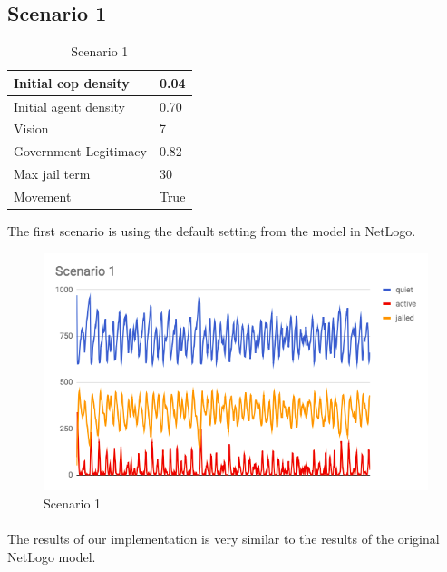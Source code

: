 \documentclass[11pt]{article}
\begin{document}
    \subsection{Scenario 1}
     \begin{table}[ht]
        \begin{center}
          \begin{tabular}{|l|l|}
          \hline
            Initial cop density & 0.04 \\
          \hline
            Initial agent density & 0.70 \\
          \hline
            Vision & 7 \\
          \hline
            Government Legitimacy & 0.82 \\
          \hline
            Max jail term & 30 \\
          \hline
            Movement & True \\
          \hline
          \end{tabular}
          \caption{Scenario 1}\label{table1}
        \end{center}
      \end{table}
      The first scenario is using the default setting from the model in 
      NetLogo.
      \begin{figure}[h!]
        \includegraphics[width=\linewidth]{Scenario_1.png}
        \caption{Scenario 1}
        \label{fig:scenario}
      \end{figure}

      \paragraph{}
      The results of our implementation is very similar to the results of the
      original NetLogo model. 
\end{document}
